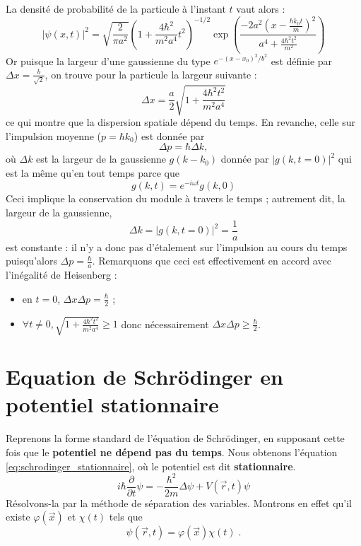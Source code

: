 \documentclass{book}
\begin{document}
La densité de probabilité de la particule à l'instant $t$ vaut alors : 
\begin{equation}
  \left| \psi(x,t) \right| ^2 = \sqrt{\frac{2}{\pi a^2}} \left( 1 + \frac{4\hbar^2}{m^2 a^4}t^2 \right) ^{-1/2} \exp \left( \frac{-2a^2 (x-\frac{\hbar k_0 t}{m})^2}{a^4 + \frac{4\hbar^2 t^2}{m^2}} \right)
\end{equation}
Or puisque la largeur d'une gaussienne du type $e^{-(x - x_0)^2/b^2}$ est définie par $\Delta x = \frac{b}{\sqrt{2}}$, on trouve pour la particule la largeur suivante : 
\begin{equation}
\Delta x = \dfrac{a}{2} \sqrt{ 1 + \dfrac{4 \hbar ^2 t^2}{m^2 a^4}}
\end{equation}
ce qui montre que la dispersion spatiale dépend du temps. En revanche, celle sur l'impulsion moyenne ($p = \hbar k_0$) est donnée par $$\Delta p = \hbar \Delta k,$$ où $\Delta k$ est la largeur de la gaussienne $g(k-k_0)$ donnée par $|g(k,t=0)|^2$ qui est la même qu'en tout temps parce que $$g(k,t) = e^{-i\omega t} g(k,0)$$ 
Ceci implique la conservation du module à travers le temps ; autrement dit, la largeur de la gaussienne, 
$$\Delta k = |g(k,t=0)|^2 = \dfrac{1}{a}$$
est constante : il n'y a donc pas d'étalement sur l'impulsion au cours du temps puisqu'alors $\Delta p = \frac{\hbar}{a}$.
Remarquons que ceci est effectivement en accord avec l'inégalité de Heisenberg : 
\begin{itemize}
  \item en $t=0$, $\Delta x \Delta p = \frac{\hbar}{2}$ ; 
  \item $\forall t \ne 0, \sqrt{1 + \frac{4\hbar^2 t^2}{m^2 a^4}} \ge 1$ donc nécessairement $\Delta x \Delta p \ge \frac{\hbar}{2}$. 
\end{itemize}



\section{Equation de Schrödinger en potentiel stationnaire}
Reprenons la forme standard de l'équation de Schrödinger, en supposant cette fois que le \textbf{potentiel ne dépend pas du temps}. Nous obtenons l'équation \eqref{eq:schrodinger_stationnaire}, où le potentiel est dit \textbf{stationnaire}. 
\begin{equation} \label{eq:schrodinger_stationnaire}
i\hbar \dfrac{\partial}{\partial t} \psi = -\dfrac{\hbar ^2}{2m} \Delta \psi + V(\vec r, t) \psi
\end{equation}
Résolvons-la par la méthode de séparation des variables. Montrons en effet qu'il existe $\varphi(\vec x)$ et $\chi(t)$ tels que $$\psi(\vec r, t) = \varphi(\vec x) \chi(t)\; .$$
\end{document}
